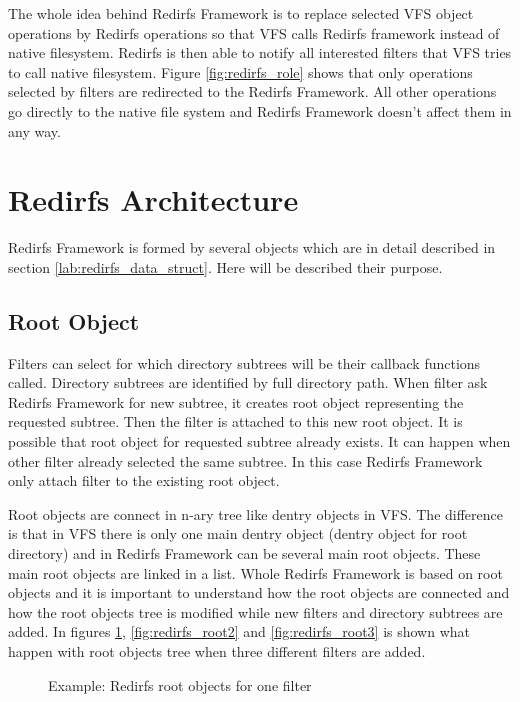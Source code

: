 The whole idea behind Redirfs Framework is to replace selected VFS object operations
by Redirfs operations so that VFS calls Redirfs framework instead of native
filesystem. Redirfs is then able to notify all interested filters that VFS tries to
call native filesystem. Figure \ref{fig:redirfs_role} shows that only operations
selected by filters are redirected to the Redirfs Framework. All other operations go
directly to the native file system and Redirfs Framework doesn't affect them in any
way.

\section{Redirfs Architecture}
\label{lab:redirfs_arch}
Redirfs Framework is formed by several objects which are in detail described in
section \ref{lab:redirfs_data_struct}. Here will be described their purpose.

\subsection{Root Object}
Filters can select for which directory subtrees will be their callback functions
called. Directory subtrees are identified by full directory path. When filter ask
Redirfs Framework for new subtree, it creates root object representing
the requested subtree. Then the filter is attached to this new root object. It is
possible that root object for requested subtree already exists. It can happen when
other filter already selected the same subtree. In this case Redirfs Framework only
attach filter to the existing root object.

Root objects are connect in n-ary tree like dentry objects in VFS. The difference is
that in VFS there is only one main dentry object (dentry object for root directory)
and in Redirfs Framework can be several main root objects. These main root objects are
linked in a list. Whole Redirfs Framework is based on root objects and it is important to
understand how the root objects are connected and how the root objects tree is
modified while new filters and directory subtrees are added. In figures
\ref{fig:redirfs_root1}, \ref{fig:redirfs_root2} and \ref{fig:redirfs_root3} is shown
what happen with root objects tree when three different filters are added.

\begin{figure}[hp]
	\begin{center}
		
	\end{center}
	\caption{Example: Redirfs root objects for one filter}
	\label{fig:redirfs_root1}
\end{figure}

